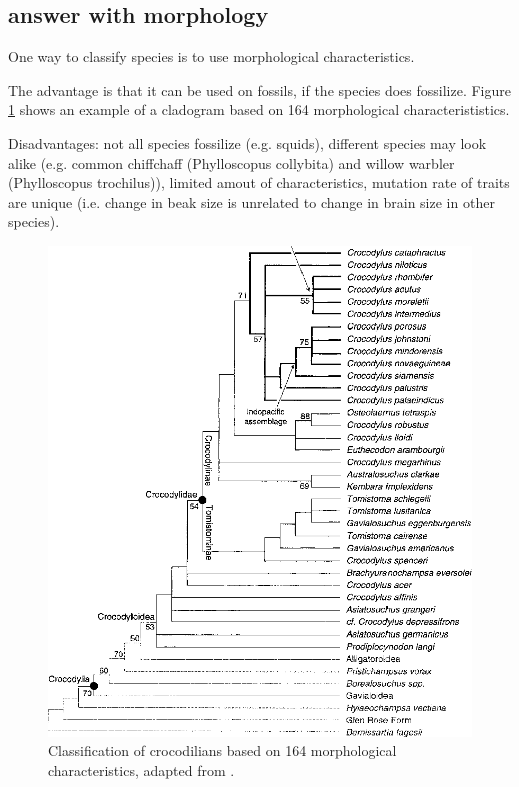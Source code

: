 \subsection{answer with morphology}

One way to classify species is to use morphological characteristics.

The advantage is that it can be used on fossils, if the
species does fossilize.
Figure \ref{fig:crocodilians_cladogram_morphology} shows an
example of a cladogram based on 164 morphological 
characterististics.

Disadvantages: not all species fossilize (e.g. squids), 
different species may look alike (e.g. common chiffchaff (Phylloscopus collybita) 
and willow warbler (Phylloscopus trochilus)), limited amout of characteristics,
mutation rate of traits are unique (i.e. change in beak
size is unrelated to change in brain size in other species).

\begin{figure}[H]
  \includegraphics[width=1.0\textwidth]{brochu_2000.png}
  \caption{
    Classification of crocodilians based on 164 morphological
    characteristics, adapted from \cite{brochu2000phylogenetic}.
  }
  \label{fig:crocodilians_cladogram_morphology}
\end{figure}

